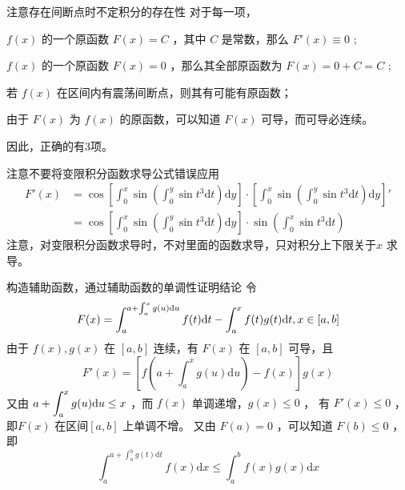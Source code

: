 \begin{answer}[C2T17]{}

\end{answer}

\begin{answer}[C2T20]{}

\end{answer}

\begin{answer}[C2T21]{}

\end{answer}

\begin{answer}[C2T22]{}

\end{answer}

\begin{answer}[C3T2]{注意存在间断点时不定积分的存在性}
    对于每一项，
    \begin{BulletItemize}
        \item $ f(x) $ 的一个原函数 $ F(x) = C $ ，其中 $ C $ 是常数，那么 $ F'(x) \equiv 0 $ ;
        \item $ f(x) $ 的一个原函数 $ F(x) = 0 $ ，那么其全部原函数为 $ F(x) = 0 + C = C $ ;
        \item 若 $ f(x) $ 在区间内有震荡间断点，则其有可能有原函数；
        \item 由于 $ F(x) $ 为 $ f(x) $ 的原函数，可以知道 $ F(x) $ 可导，而可导必连续。
    \end{BulletItemize}
    因此，正确的有3项。
\end{answer}

\begin{answer}[C3T13]{注意不要将变限积分函数求导公式错误应用}
    \begin{equation*}
        \begin{aligned}
            F'(x) &= \cos \left[\int_0^x\sin\left(\int_0^y\sin t^3 \mathrm{d}t\right)\mathrm{d}y\right] \cdot
            \left[\int_0^x\sin\left(\int_0^y\sin t^3 \mathrm{d}t\right)\mathrm{d}y\right]'
            \\&= \cos \left[\int_0^x\sin\left(\int_0^y\sin t^3 \mathrm{d}t\right)\mathrm{d}y\right]
            \cdot \sin\left(\int_0^x\sin t^3 \mathrm{d}t\right)
        \end{aligned}
    \end{equation*}
    注意，对变限积分函数求导时，不对里面的函数求导，只对积分上下限关于$ x $ 求导。
\end{answer}

\begin{answer}[C3T21]{构造辅助函数，通过辅助函数的单调性证明结论}
    令 $$ \displaystyle F(x) = \int_a^{a+\int_a^x g(u)\mathrm{d}u}f(t)\mathrm{d}t - \int_a^x f(t)g(t)\mathrm{d}t,x\in[a,b] $$
    由于 $ f(x),g(x) $ 在 $ [a,b] $ 连续，有 $ F(x) $ 在 $ [a,b] $ 可导，且
    $$
        F'(x) = \left[f(a+\int_a^x g(u)\mathrm{d}u)-f(x)\right]g(x)
    $$ 
    又由 $ \displaystyle a+\int_a^x g(u)\mathrm{d}u \leq x $ ，而 $ f(x) $ 单调递增，$ g(x)\leq 0 $ ，
    有 $ F'(x)\leq 0 $ ，即$ F(x) $ 在区间$ [a,b] $ 上单调不增。
    又由 $ F(a) = 0 $ ，可以知道 $ F(b)\leq 0 $ ，即
    $$
        \int_a^{a+\int_a^bg(t)\mathrm{d}t}f(x)\mathrm{d}x\leq \int_a^b f(x)g(x)\mathrm{d}x
    $$ 
\end{answer}